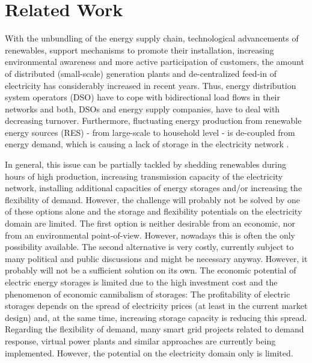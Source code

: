 \documentclass[review]{elsarticle}
\begin{document}
\section{Related Work}
\label{sec:related_work}
With the unbundling of the energy supply chain, technological
advancements of renewables, support mechanisms to promote their
installation, increasing environmental awareness and more active
participation of customers, the amount of distributed (small-scale)
generation plants and de-centralized feed-in of electricity has
considerably increased in recent years. Thus, energy distribution
system operators (DSO) have to cope with bidirectional load flows in
their networks and both, DSOs and energy supply companies, have to
deal with decreasing turnover. Furthermore, fluctuating energy
production from renewable energy sources (RES) - from large-scale to
household level - is de-coupled from  energy demand, which is 
causing a lack of storage in the electricity network
\cite{trebolle_2010}. 

In general, this issue can be partially tackled by shedding
renewables during hours of high production, increasing
transmission capacity of the electricity network, installing
additional capacities of energy storages and/or increasing the
flexibility of demand.
However, the challenge will probably not be solved by one of these
options alone and the storage and flexibility potentials on the
electricity domain are limited. 
The first option is neither desirable from an
economic, nor from an environmental point-of-view. However, nowadays
this is often the only possibility available. The second alternative
is very costly, currently subject to many political and public
discussions and might be necessary anyway. However, it probably will
not be a sufficient solution on its own. The economic potential of
electric energy storages is limited due to the high investment cost
and the phenomenon of economic cannibalism of storages: The
profitability of electric storages depends on the spread of
electricity prices (at least in the current market design) and, at
the same time, increasing storage capacity
is reducing this spread. Regarding the flexibility of demand, many
smart grid projects related to demand response, virtual power plants
and similar approaches are currently being implemented. However, the
potential on the electricity domain only is limited. 
\end{document}
